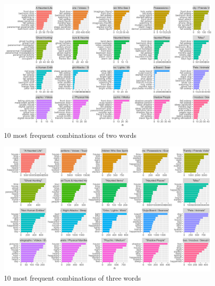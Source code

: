 \documentclass[twocolumn]{article}
\begin{document}
\begin{figure}[htbp]
    \centering
    \includegraphics[width=1\columnwidth]{figures/bigrams.png}
    \caption{10 most frequent combinations of two words}
    \label{unigrams}
\end{figure}

\begin{figure}[htbp]
    \centering
    \includegraphics[width=0.9\columnwidth]{figures/unigrams.png}
    \caption{10 most frequent combinations of three words}
    \label{unigrams}
\end{figure}
\end{document}
